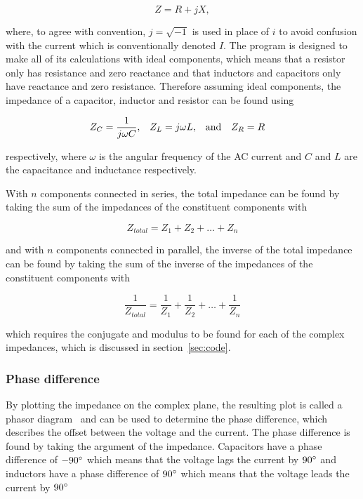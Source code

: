 \begin{equation}
  Z=R+jX ,
\end{equation}

where, to agree with convention, $j = \sqrt{-1}$ is used in place of $i$ to avoid confusion with the current which is conventionally denoted $I$.
The program is designed to make all of its calculations with ideal components, which means that a resistor only has resistance and zero reactance and that inductors and capacitors only have reactance and zero resistance. Therefore assuming ideal components, the impedance of a capacitor, inductor and resistor can be found using

\begin{align}
  Z_{C}&=\frac{1}{j\omega{}C},   &   Z_{L}&=j\omega{}L,   & \textnormal{and} & &   Z_{R}&=R
\end{align}

respectively, where $\omega$ is the angular frequency of the AC current and $C$ and $L$ are the capacitance and inductance respectively.

With $n$ components connected in series, the total impedance can be found by taking the sum of the impedances of the constituent components with

\begin{equation}
  Z_{total} = Z_1 + Z_2 + \ldots + Z_n
\end{equation}

and with $n$ components connected in parallel, the inverse of the total impedance can be found by taking the sum of the inverse of the impedances of the constituent components with

\begin{equation}
  \frac{1}{Z_{total}} = \frac{1}{Z_1} + \frac{1}{Z_2} + \ldots + \frac{1}{Z_n}
\end{equation}

which requires the conjugate and modulus to be found for each of the complex impedances, which is discussed in section~\ref{sec:code}.

\subsubsection*{Phase difference}
By plotting the impedance on the complex plane, the resulting plot is called a phasor diagram~\cite{} and can be used to determine the phase difference, which describes the offset between the voltage and the current. The phase difference is found by taking the argument of the impedance. Capacitors have a phase difference of $-90\degree$ which means that the voltage lags the current by $90\degree$ and inductors have a phase difference of $90\degree$ which means that the voltage leads the current by $90\degree$
